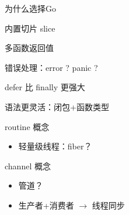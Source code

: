 \documentclass{beamer}
\begin{document}
\begin{frame}[t]{为什么选择Go}
\begin{itemize}
{\begin{itemize}
{                    }
                     {
                        \item 内置切片 slice
                        \item 多函数返回值
                        \item 错误处理：error ? panic ?
                        \item defer 比 finally 更强大
                        \item 语法更灵活：闭包+函数类型
                    }
                \end{itemize}
        }
         {
            \item routine 概念
                \begin{itemize}
                    \item 轻量级线程：fiber？
                \end{itemize}
            \item channel 概念
                \begin{itemize}
                    \item 管道？
                    \item 生产者+消费者 $\rightarrow$ 线程同步
                \end{itemize}
        }
    \end{itemize}
\end{frame}
\end{document}
